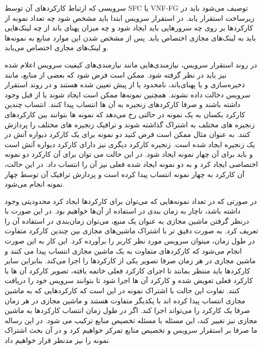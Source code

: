 سرویسی که ارتباط کارکردهای آن توسط SFC یا VNF-FG توصیف می‌شود باید در زیرساخت استقرار یابد.
در استقرار سرویس ابتدا باید مشخص شود چه تعداد نمونه از کارکردها بر روی چه سرورهایی باید ایجاد شود و چه میزان پهنای باند از چه لینک‌هایی باید به لینک‌های مجازی اختصاص یابد.
پس از مشخص شدن این موارد منابع به نمونه‌ها و لینک‌های مجازی اختصاص می‌یابد.

در روند استقرار سرویس، نیازمندی‌هایی مانند نیازمندی‌های کیفیت سرویس اعلام شده نیز باید در نظر گرفته شود.
ممکن است فرض شود که بعضی از منابع، مانند ذخیره‌سازی و یا پهنای‌باند، نامحدود یا از پیش تعیین شده هستند و در روند استقرار سرویس دخالت داده نشوند.
همچنین نمونه‌ها ممکن است ایجاد شوند یا از قبل وجود داشته باشند و صرفا کارکردهای زنجیره به آن ها انتساب پیدا کنند.
انتساب چندین کارکرد یکسان به یک نمونه در حالتی رخ می‌دهد که نمونه ها بتوانند بین کارکردهای زنجیره های مختلف به اشتراک گذاشته شوند و ترافیک زنجیره های مختلف را پردازش کنند.
به عنوان مثال ممکن است فرض کنید دو نمونه برای یک کارکرد دیواره آتش در یک زنجیره ایجاد شده است. زنجیره کارکرد دیگری نیز دارای کارکرد دیواره آتش است و باید برای آن چهار نمونه ایجاد شود.
در این حالت می توان برای آن کارکرد دو نمونه اختصاصی ایجاد کرد و به دو نمونه ایجاد شده فعلی نیز آن را انتساب داد.
در این حالت، آن کارکرد به چهار نمونه انتساب پیدا کرده است و پردازش ترافیک آن توسط چهار نمونه انجام می‌شود.

در صورتی که در تعداد نمونه‌هایی که می‌توان برای کارکردها ایجاد کرد محدودیتی وجود داشته باشد، ناچار به زمان بندی در استفاده از آن‌ها خواهیم بود.
در این صورت با درنظر گرفتن ماشین مجازی به عنوان یک منبع، می‌توان زمان‌بندی در استفاده آن را تعریف کرد.
به صورت دقیق تر با اشتراک ماشین‌های مجازی بین چندین کارکرد متفاوت در طول زمان، میتوان سرویس مورد نظر کاربر را برآورده کرد.
این کار به این صورت انجام می‌شود که کارکردهای متفاوت به یک ماشین مجازی انتساب پیدا می کنند و ماشین مجازی در هر زمان صرفا تصویر یکی از کارکردها را اجرا می‌کند.
بنابراین سایر کارکردها باید منتظر بمانند تا اجرای کارکرد فعلی خاتمه یافته، تصویر کارکرد آن ها با کارکرد فعلی تعویض شده و کارکرد آن ها اجرا شود تا بتوانند سرویس خود را دریافت کنند.
تفاوت این حالت با اشتراک نمونه در این است که کارکردهایی که به ماشین مجازی انتساب پیدا کرده اند با یکدیگر متفاوت هستند و ماشین مجازی در هر زمان صرفا یک کارکرد را می‌تواند اجرا کند.
اگر در طول زمان انتساب کارکردها به ماشین مجازی نیز تغییر کند، این مسئله با مسئله تخصیص منابع ترکیب می شود.
در این رساله ما صرفا بر استقرار سرویس و تخصیص منابع تمرکز خواهیم کرد و در آن بحث اشتراک نمونه را نیز مدنظر قرار خواهیم داد.


